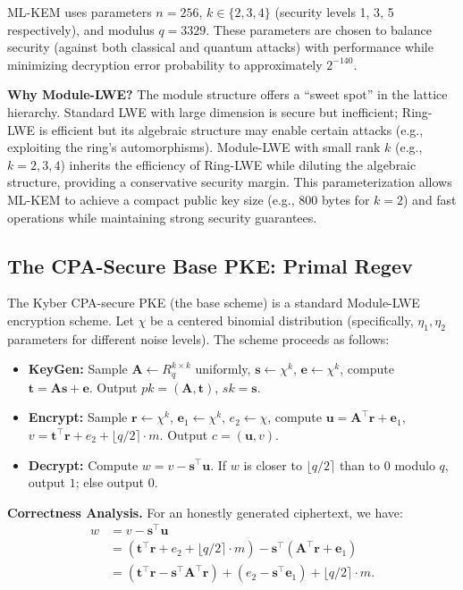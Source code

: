 ML-KEM uses parameters $n = 256$, $k \in \{2, 3, 4\}$ (security levels 1, 3, 5 respectively), and modulus $q = 3329$. These parameters are chosen to balance security (against both classical and quantum attacks) with performance while minimizing decryption error probability to approximately $2^{-140}$.

\noindent\textbf{Why Module-LWE?} The module structure offers a ``sweet spot'' in the lattice hierarchy. Standard LWE with large dimension is secure but inefficient; Ring-LWE is efficient but its algebraic structure may enable certain attacks (e.g., exploiting the ring's automorphisms). Module-LWE with small rank $k$ (e.g., $k=2,3,4$) inherits the efficiency of Ring-LWE while diluting the algebraic structure, providing a conservative security margin. This parameterization allows ML-KEM to achieve a compact public key size (e.g., 800 bytes for $k=2$) and fast operations while maintaining strong security guarantees.

\subsection{The CPA-Secure Base PKE: Primal Regev}

The Kyber CPA-secure PKE (the base scheme) is a standard Module-LWE encryption scheme. Let $\chi$ be a centered binomial distribution (specifically, $\eta_1, \eta_2$ parameters for different noise levels). The scheme proceeds as follows:

\begin{itemize}
    \item \textbf{KeyGen:} Sample $\boldsymbol{A} \gets {R}_q^{k \times k}$ uniformly, $\boldsymbol{s} \gets \chi^k$, $\boldsymbol{e} \gets \chi^k$, compute $\boldsymbol{t} = \boldsymbol{A}\boldsymbol{s} + \boldsymbol{e}$. Output $pk = (\boldsymbol{A}, \boldsymbol{t})$, $sk = \boldsymbol{s}$.
    \item \textbf{Encrypt:} Sample $\boldsymbol{r} \gets \chi^k$, $\boldsymbol{e}_1 \gets \chi^k$, $e_2 \gets \chi$, compute $\boldsymbol{u} = \boldsymbol{A}^\top \boldsymbol{r} + \boldsymbol{e}_1$, $v = \boldsymbol{t}^\top \boldsymbol{r} + e_2 + \lfloor q/2 \rceil \cdot m$. Output $c = (\boldsymbol{u}, v)$.
    \item \textbf{Decrypt:} Compute $w = v - \boldsymbol{s}^\top \boldsymbol{u}$. If $w$ is closer to $\lfloor q/2 \rceil$ than to $0$ modulo $q$, output $1$; else output $0$.
\end{itemize}

\noindent\textbf{Correctness Analysis.} For an honestly generated ciphertext, we have:
$$
\begin{aligned}
w &= v - \boldsymbol{s}^\top \boldsymbol{u} \\
&= (\boldsymbol{t}^\top \boldsymbol{r} + e_2 + \lfloor q/2 \rceil \cdot m) - \boldsymbol{s}^\top (\boldsymbol{A}^\top \boldsymbol{r} + \boldsymbol{e}_1) \\
&= (\boldsymbol{t}^\top \boldsymbol{r} - \boldsymbol{s}^\top \boldsymbol{A}^\top \boldsymbol{r}) + (e_2 - \boldsymbol{s}^\top \boldsymbol{e}_1) + \lfloor q/2 \rceil \cdot m.
\end{aligned}
$$

